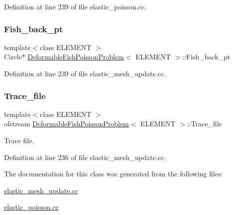 Definition at line 239 of file elastic\+\_\+poisson.\+cc.

\mbox{\label{classDeformableFishPoissonProblem_a88745d43dc7a9377c13190ce1bed79e7}} 
\subsubsection{\texorpdfstring{Fish\+\_\+back\+\_\+pt}{Fish\_back\_pt}\hspace{0.1cm}{\footnotesize\ttfamily [2/2]}}
{\footnotesize\ttfamily template$<$class E\+L\+E\+M\+E\+NT $>$ \\
Circle$\ast$ \hyperlink{classDeformableFishPoissonProblem}{Deformable\+Fish\+Poisson\+Problem}$<$ E\+L\+E\+M\+E\+NT $>$\+::Fish\+\_\+back\+\_\+pt\hspace{0.3cm}{\ttfamily [private]}}



Definition at line 239 of file elastic\+\_\+mesh\+\_\+update.\+cc.

\mbox{\label{classDeformableFishPoissonProblem_a9fc310452a96891d566f50f3a231d5d5}} 
\subsubsection{\texorpdfstring{Trace\+\_\+file}{Trace\_file}}
{\footnotesize\ttfamily template$<$class E\+L\+E\+M\+E\+NT $>$ \\
ofstream \hyperlink{classDeformableFishPoissonProblem}{Deformable\+Fish\+Poisson\+Problem}$<$ E\+L\+E\+M\+E\+NT $>$\+::Trace\+\_\+file\hspace{0.3cm}{\ttfamily [private]}}



Trace file. 



Definition at line 236 of file elastic\+\_\+mesh\+\_\+update.\+cc.



The documentation for this class was generated from the following files\+:\begin{DoxyCompactItemize}
\item 
\hyperlink{elastic__mesh__update_8cc}{elastic\+\_\+mesh\+\_\+update.\+cc}\item 
\hyperlink{elastic__poisson_8cc}{elastic\+\_\+poisson.\+cc}\end{DoxyCompactItemize}
